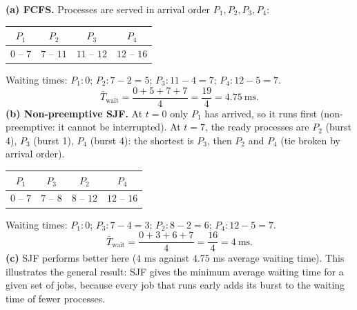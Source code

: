 \documentclass[11pt]{article}
\begin{document}
\begin{corrige}
\textbf{(a) FCFS.} Processes are served in arrival order $P_1, P_2, P_3, P_4$:
\begin{center}
\begin{tabular}{|c|c|c|c|}
\hline
\rowcolor{popblueL} $P_1$ & $P_2$ & $P_3$ & $P_4$ \\
\hline
$0$ -- $7$ & $7$ -- $11$ & $11$ -- $12$ & $12$ -- $16$ \\
\hline
\end{tabular}
\end{center}
Waiting times: $P_1: 0$; $P_2: 7-2=5$; $P_3: 11-4=7$; $P_4: 12-5=7$.
\[ \bar{T}_{\text{wait}} = \frac{0+5+7+7}{4} = \frac{19}{4} = 4.75\ \text{ms}. \]
\textbf{(b) Non-preemptive SJF.} At $t=0$ only $P_1$ has arrived, so it runs first (non-preemptive: it cannot be interrupted). At $t=7$, the ready processes are $P_2$ (burst 4), $P_3$ (burst 1), $P_4$ (burst 4): the shortest is $P_3$, then $P_2$ and $P_4$ (tie broken by arrival order).
\begin{center}
\begin{tabular}{|c|c|c|c|}
\hline
\rowcolor{popblueL} $P_1$ & $P_3$ & $P_2$ & $P_4$ \\
\hline
$0$ -- $7$ & $7$ -- $8$ & $8$ -- $12$ & $12$ -- $16$ \\
\hline
\end{tabular}
\end{center}
Waiting times: $P_1: 0$; $P_3: 7-4=3$; $P_2: 8-2=6$; $P_4: 12-5=7$.
\[ \bar{T}_{\text{wait}} = \frac{0+3+6+7}{4} = \frac{16}{4} = 4\ \text{ms}. \]
\textbf{(c)} SJF performs better here ($4$ ms against $4.75$ ms average waiting time). This illustrates the general result: SJF gives the minimum average waiting time for a given set of jobs, because every job that runs early adds its burst to the waiting time of fewer processes.
\end{corrige}
\end{document}
